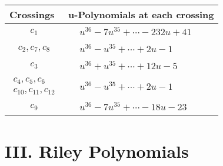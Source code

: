 \documentclass[1p]{elsarticle_modified}
\theoremstyle{definition}
\begin{document}
\begin{tabular}{m{50pt}|m{274pt}}
Crossings & \hspace{64pt}u-Polynomials at each crossing \\
\hline $$\begin{aligned}c_{1}\end{aligned}$$&$\begin{aligned}
&u^{36}-7 u^{35}+\cdots-232 u+41
\end{aligned}$\\
\hline $$\begin{aligned}c_{2},c_{7},c_{8}\end{aligned}$$&$\begin{aligned}
&u^{36}- u^{35}+\cdots+2 u-1
\end{aligned}$\\
\hline $$\begin{aligned}c_{3}\end{aligned}$$&$\begin{aligned}
&u^{36}+u^{35}+\cdots+12 u-5
\end{aligned}$\\
\hline $$\begin{aligned}c_{4},c_{5},c_{6}\\c_{10},c_{11},c_{12}\end{aligned}$$&$\begin{aligned}
&u^{36}- u^{35}+\cdots+2 u-1
\end{aligned}$\\
\hline $$\begin{aligned}c_{9}\end{aligned}$$&$\begin{aligned}
&u^{36}-7 u^{35}+\cdots-18 u-23
\end{aligned}$\\
\hline
\end{tabular}\newpage\renewcommand{\arraystretch}{1}
\centering \section*{ III. Riley Polynomials}
\end{document}
